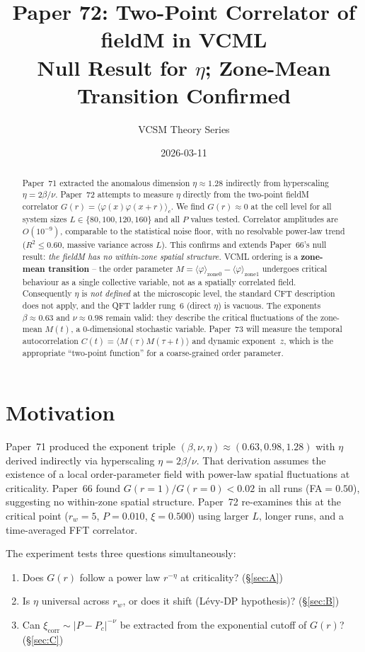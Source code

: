 \documentclass[11pt,a4paper]{article}
\title{Paper 72: Two-Point Correlator of fieldM in VCML\\
\large Null Result for $\eta$; Zone-Mean Transition Confirmed}
\author{VCSM Theory Series}
\date{2026-03-11}
\begin{document}
\maketitle

\begin{abstract}
Paper~71 extracted the anomalous dimension $\eta\approx1.28$ indirectly from
hyperscaling $\eta=2\beta/\nu$.  Paper~72 attempts to measure $\eta$ directly
from the two-point fieldM correlator $G(r)=\langle\varphi(x)\varphi(x{+}r)\rangle_c$.
We find $G(r)\approx0$ at the cell level for all system sizes
$L\in\{80,100,120,160\}$ and all $P$ values tested.  Correlator amplitudes are
$O(10^{-9})$, comparable to the statistical noise floor, with no resolvable
power-law trend ($R^2\leq0.60$, massive variance across $L$).
This confirms and extends Paper~66's null result:
\emph{the fieldM has no within-zone spatial structure.}
VCML ordering is a \textbf{zone-mean transition} -- the order parameter
$M=\langle\varphi\rangle_{\text{zone}0}-\langle\varphi\rangle_{\text{zone}1}$
undergoes critical behaviour as a single collective variable, not as a spatially
correlated field.  Consequently $\eta$ is \emph{not defined} at the microscopic
level, the standard CFT description does not apply, and the QFT ladder rung~6
(direct $\eta$) is vacuous.  The exponents $\beta\approx0.63$ and $\nu\approx0.98$
remain valid: they describe the critical fluctuations of the zone-mean $M(t)$,
a 0-dimensional stochastic variable.  Paper~73 will measure the temporal
autocorrelation $C(t)=\langle M(\tau)M(\tau{+}t)\rangle$ and dynamic exponent~$z$,
which is the appropriate ``two-point function'' for a coarse-grained order parameter.
\end{abstract}

\section{Motivation}

Paper~71 produced the exponent triple $(\beta,\nu,\eta)\approx(0.63,0.98,1.28)$
with $\eta$ derived indirectly via hyperscaling $\eta=2\beta/\nu$.  That derivation
assumes the existence of a local order-parameter field with power-law spatial
fluctuations at criticality.  Paper~66 found $G(r{=}1)/G(r{=}0)<0.02$ in all
runs (FA$=0.50$), suggesting no within-zone spatial structure.  Paper~72
re-examines this at the critical point ($r_w{=}5$, $P{=}0.010$, $\xi{=}0.500$)
using larger $L$, longer runs, and a time-averaged FFT correlator.

The experiment tests three questions simultaneously:
\begin{enumerate}
  \item Does $G(r)$ follow a power law $r^{-\eta}$ at criticality? (\S\ref{sec:A})
  \item Is $\eta$ universal across $r_w$, or does it shift (L\'{e}vy-DP hypothesis)? (\S\ref{sec:B})
  \item Can $\xi_\text{corr}\sim|P-P_c|^{-\nu}$ be extracted from the exponential
        cutoff of $G(r)$? (\S\ref{sec:C})
\end{enumerate}
\end{document}

